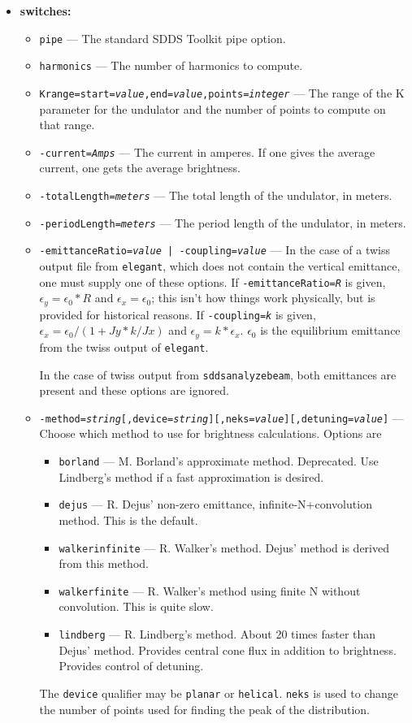 \documentclass[11pt]{article}
\begin{document}
\begin{itemize}
\item {\bf switches:}
\begin{itemize}
\item {\tt pipe} --- The standard SDDS Toolkit pipe option.
\item {\tt harmonics} --- The number of harmonics to compute.
\item {\tt Krange=start={\em value},end={\em value},points={\em integer}} --- The range of the
 K parameter for the undulator and the number of points to compute on that range.
\item {\tt -current={\em Amps}} --- The current in amperes.  If one gives the average current,
 one gets the average brightness.  
\item {\tt -totalLength={\em meters}} --- The total length of the undulator, in meters.
\item {\tt -periodLength={\em meters}} ---  The period length of the undulator, in meters.
\item {\tt -emittanceRatio={\em value}  | -coupling={\em value}} --- In the case of a twiss
 output file from {\tt elegant}, which does not contain the vertical emittance, one must
 supply one of these options.  If {\tt -emittanceRatio={\em R}} is given, $\epsilon_y = \epsilon_0*R$ 
 and $\epsilon_x = \epsilon_0$; this isn't how things work physically, but is provided for historical
 reasons.
 If {\tt -coupling={\em k}} is given, $\epsilon_x = \epsilon_0/(1+Jy*k/Jx)$
 and $\epsilon_y = k*\epsilon_x$.  $\epsilon_0$ is the equilibrium emittance from the twiss output
 of {\tt elegant}.  

 In the case of twiss output from {\tt sddsanalyzebeam}, both emittances are present and these options
 are ignored.
\item {\tt -method={\em string}[,device={\em string}][,neks={\em value}][,detuning={\em value}]} --- Choose which method to
 use for brightness calculations.  Options are
 \begin{itemize} 
 \item {\tt borland} --- M. Borland's approximate method. Deprecated. Use Lindberg's method if a fast
   approximation is desired.
 \item {\tt dejus} --- R. Dejus' non-zero emittance, infinite-N+convolution method.  This is the
   default.
 \item {\tt walkerinfinite} --- R. Walker's method.  Dejus' method is derived from this method.
 \item {\tt walkerfinite} --- R. Walker's method using finite N without convolution.  This is 
   quite slow.
 \item {\tt lindberg} --- R. Lindberg's method. About 20 times faster than Dejus' method.
   Provides central cone flux in addition to brightness. Provides control of detuning.
 \end{itemize}
 The {\tt device} qualifier may be {\tt planar} or {\tt helical}.  {\tt neks} is used to 
 change the number of points used for finding the peak of the distribution.
\end{itemize}


\end{itemize}
\end{document}
